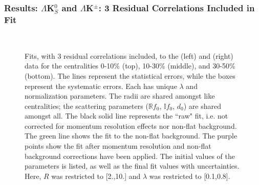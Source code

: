 \documentclass[../AnalysisNoteJBuxton.tex]{subfiles}
\begin{document}
\subsubsection{Results: \texorpdfstring{$\Lambda$K$^{0}_{S}$ and $\Lambda$K$^{\pm}$: 3 Residual Correlations Included in Fit}{TEXT}}
\label{ResultsLamK_3Res}

\begin{figure}[h!]
  \centering
  \\  
  \caption[\LamALamKs Fits with 3 Residuals]{Fits, with 3 residual correlations included, to the \LamKs (left) and \ALamKs (right) data for the centralities 0-10\% (top), 10-30\% (middle), and 30-50\% (bottom).
The lines represent the statistical errors, while the boxes represent the systematic errors.
Each has unique $\lambda$ and normalization parameters.
The radii are shared amongst like centralities; the scattering parameters ($\mathbb{R}f_{0}$, $\mathbb{I}f_{0}$, $d_{0}$) are shared amongst all.
The black solid line represents the ``raw" fit, i.e. not corrected for momentum resolution effects nor non-flat background.  
The green line shows the fit to the non-flat background.
The purple points show the fit after momentum resolution and non-flat background corrections have been applied.
The initial values of the parameters is listed, as well as the final fit values with uncertainties.
Here, $R$ was restricted to [2.,10.] and $\lambda$ was restricted to [0.1,0.8].}
  \label{fig:LamK0wConjFits_3Res}
\end{figure}
\end{document}
